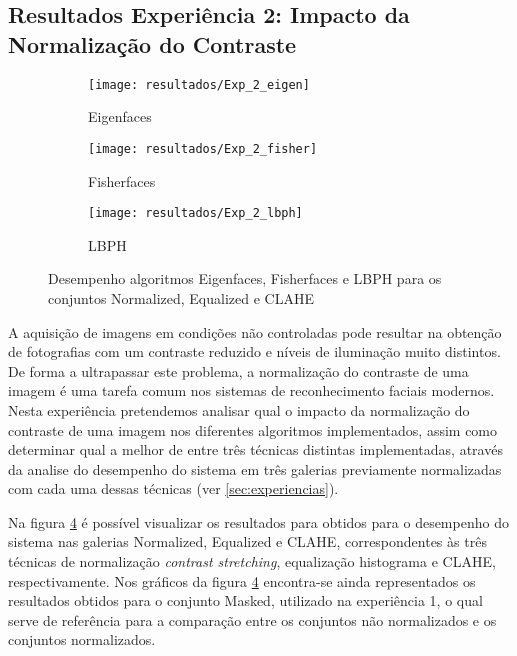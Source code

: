 \subsection{Resultados Experiência 2: Impacto da Normalização do Contraste}
\begin{figure}[p]
        \centering
        \begin{subfigure}[b]{0.58\textwidth}
                \centering
                \texttt{[image: resultados/Exp\_2\_eigen]}
                \caption{Eigenfaces}
                \label{fig:masked_normalized_equalized_clahe_eigen}
        \end{subfigure}%

        \begin{subfigure}[b]{0.58\textwidth}
                \centering
                \texttt{[image: resultados/Exp\_2\_fisher]}
                \caption{Fisherfaces}
                \label{fig:masked_normalized_equalized_clahe_fisher}
        \end{subfigure}

        \begin{subfigure}[b]{0.58\textwidth}
                \centering
                \texttt{[image: resultados/Exp\_2\_lbph]}
                \caption{LBPH}
                \label{fig:masked_normalized_equalized_clahe_lbph}
        \end{subfigure}
        \caption{Desempenho algoritmos Eigenfaces, Fisherfaces e LBPH para os conjuntos Normalized, Equalized e CLAHE}
        \label{fig:exp2}
\end{figure}

A aquisição de imagens em condições não controladas pode resultar na obtenção de fotografias com um contraste reduzido e níveis de iluminação muito distintos. De forma a ultrapassar este problema, a normalização do contraste de uma imagem é uma tarefa comum nos sistemas de reconhecimento faciais modernos. Nesta experiência pretendemos analisar qual o impacto da normalização do contraste de uma imagem nos diferentes algoritmos implementados, assim como determinar qual a melhor de entre três técnicas distintas implementadas, através da analise do desempenho do sistema em três galerias previamente normalizadas com cada uma dessas técnicas (ver \ref{sec:experiencias}).

Na figura \ref{fig:exp2} é possível visualizar os resultados para obtidos para o desempenho do sistema nas galerias Normalized, Equalized e CLAHE, correspondentes às três técnicas de normalização \textit{contrast stretching}, equalização histograma e CLAHE, respectivamente. Nos gráficos da figura \ref{fig:exp2} encontra-se ainda representados os resultados obtidos para o conjunto Masked, utilizado na experiência 1, o qual serve de referência para a comparação entre os conjuntos não normalizados e os conjuntos normalizados.

